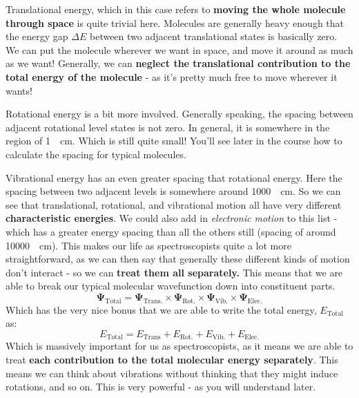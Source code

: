 \documentclass{memoir}[11pt,oneside,a4paper,openany]
\newcommand{\wf}{\ensuremath{\bm{\Psi}}\xspace}
\begin{document}
Translational energy, which in this case refers to \textbf{moving the whole molecule through space} is quite trivial here. Molecules are generally heavy enough that the energy gap $\Delta E$ between two adjacent translational states is basically zero. We can put the molecule wherever we want in space, and move it around as much as we want! Generally, we can \textbf{neglect the translational contribution to the total energy of the molecule} - as it's pretty much free to move wherever it wants!

Rotational energy is a bit more involved. Generally speaking, the spacing between adjacent rotational level states is not zero. In general, it is somewhere in the region of \SI{1}{\per\centi\metre}. Which is still quite small! You'll see later in the course how to calculate the spacing for typical molecules. 

Vibrational energy has an even greater spacing that rotational energy. Here the spacing between two adjacent levels is somewhere around \SI{1000}{\per\centi\metre}. So we can see that translational, rotational, and vibrational motion all have very different \textbf{characteristic energies}. We could also add in \emph{electronic motion} to this list - which has a greater energy spacing than all the others still (spacing of around \SI{10000}{\per\centi\metre}). This makes our life as spectroscopists quite a lot more straightforward, as we can then say that generally these different kinds of motion don't interact - so we can \textbf{treat them all separately.} This means that we are able to break our typical molecular wavefunction down into constituent parts.
\begin{equation}
	\wf_{\text{Total}} = \wf_{\text{Trans.}} \times \wf_{\text{Rot.}} \times \wf_{\text{Vib.}} \times \wf_{\text{Elec.}}
\end{equation}
Which has the very nice bonus that we are able to write the total energy, $E_\text{Total}$ as:
\begin{equation}
	E_\text{Total} = E_\text{Trans} + E_\text{Rot.} + E_\text{Vib.} + E_\text{Elec.}
\end{equation}
Which is massively important for us as spectroscopists, as it means we are able to treat \textbf{each contribution to the total molecular energy separately}. This means we can think about vibrations without thinking that they might induce rotations, and so on. This is very powerful - as you will understand later.
\end{document}
